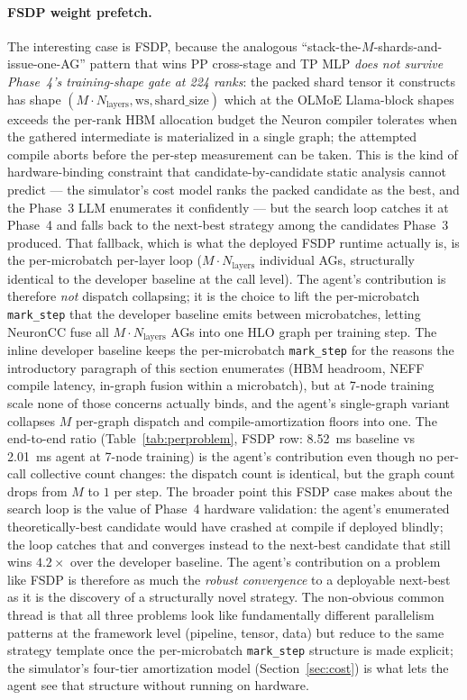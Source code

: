 \paragraph{FSDP weight prefetch.} The interesting case is FSDP,
because the analogous ``stack-the-$M$-shards-and-issue-one-AG''
pattern that wins PP cross-stage and TP MLP \emph{does not
survive Phase~4's training-shape gate at 224 ranks}: the packed
shard tensor it constructs has shape
$(M \cdot N_\text{layers}, \text{ws}, \text{shard\_size})$ which
at the OLMoE Llama-block shapes exceeds the per-rank HBM
allocation budget the Neuron compiler tolerates when the
gathered intermediate is materialized in a single graph; the
attempted compile aborts before the per-step measurement can be
taken. This is the kind of hardware-binding constraint that
candidate-by-candidate static analysis cannot predict --- the
simulator's cost model ranks the packed candidate as the best,
and the Phase~3 LLM enumerates it confidently --- but the search
loop catches it at Phase~4 and falls back to the next-best
strategy among the candidates Phase~3 produced. That fallback,
which is what the deployed FSDP runtime actually is, is the
per-microbatch per-layer loop ($M \cdot N_\text{layers}$
individual AGs, structurally identical to the developer baseline
at the call level). The agent's contribution is therefore
\emph{not} dispatch collapsing; it is the choice to lift the
per-microbatch \texttt{mark\_step} that the developer baseline
emits between microbatches, letting NeuronCC fuse all
$M \cdot N_\text{layers}$ AGs into one HLO graph per training
step. The inline developer baseline keeps the per-microbatch
\texttt{mark\_step} for the reasons the introductory paragraph
of this section enumerates (HBM headroom, NEFF compile latency,
in-graph fusion within a microbatch), but at 7-node training
scale none of those concerns actually binds, and the agent's
single-graph variant collapses $M$ per-graph dispatch and
compile-amortization floors into one. The end-to-end ratio
(Table~\ref{tab:perproblem}, FSDP row: 8.52~ms baseline vs
2.01~ms agent at 7-node training) is the agent's contribution
even though no per-call collective count changes: the dispatch
count is identical, but the graph count drops from $M$ to $1$
per step. The broader point this FSDP case makes about the
search loop is the value of Phase~4 hardware validation:
the agent's enumerated theoretically-best candidate would have
crashed at compile if deployed blindly; the loop catches that
and converges instead to the next-best candidate that still wins
$4.2\times$ over the developer baseline. The agent's contribution
on a problem like FSDP is therefore as much the
\emph{robust convergence} to a deployable next-best as it is the
discovery of a structurally novel strategy. The non-obvious common thread is that all three
problems look like fundamentally different parallelism patterns at
the framework level (pipeline, tensor, data) but reduce to the same
strategy template once the per-microbatch \texttt{mark\_step}
structure is made explicit; the simulator's four-tier amortization
model (Section~\ref{sec:cost}) is what lets the agent see that
structure without running on hardware.

\FloatBarrier


